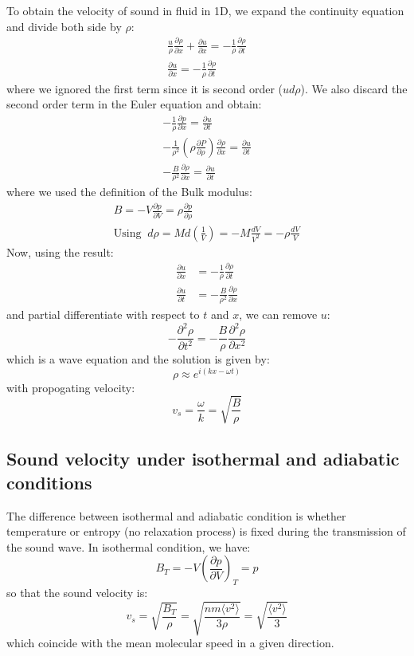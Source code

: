 \documentclass{article}
\newcommand{\pfrac}[2]{\frac{\partial #1}{\partial #2}}
\begin{document}
To obtain the velocity of sound in fluid in 1D, we expand the continuity equation and divide 
both side by $\rho$:
\begin{gather}
    \frac{u}{\rho} \pfrac{\rho}{x} + \pfrac{u}{x} = - \frac{1}{\rho} \pfrac{\rho}{t} \\ 
    \pfrac{u}{x} = - \frac{1}{\rho} \pfrac{\rho}{t}
\end{gather}
where we ignored the first term since it is second order ($u d\rho$). 
We also discard the second order term in the Euler equation and obtain:
\begin{gather}
    -\frac{1}{\rho} \frac{\partial p}{\partial x} = \frac{\partial u}{\partial t} \\
    - \frac{1}{\rho^2} \left( \rho \pfrac{P}{\rho} \right) \pfrac{\rho}{x} = \frac{\partial u}{\partial t} \\
    - \frac{B}{\rho^2} \pfrac{\rho}{x} = \frac{\partial u}{\partial t}
\end{gather}
where we used the definition of the Bulk modulus:
\begin{gather}
    B = -V \pfrac{p}{V} = \rho \pfrac{p}{\rho} \\
    \text{Using  } \ d\rho = M d\left( \frac{1}{V} \right) = - M \frac{dV}{V^2} = - \rho \frac{dV}{V}
\end{gather}
Now, using the result:
\begin{align}
    \pfrac{u}{x} &= - \frac{1}{\rho} \pfrac{\rho}{t} \\
    \frac{\partial u}{\partial t} &= - \frac{B}{\rho^2} \pfrac{\rho}{x}
\end{align}
and partial differentiate with respect to $t$ and $x$, we can remove $u$:
\begin{equation}
    - \frac{\partial^2 \rho}{\partial t^2} = - \frac{B}{\rho} \frac{\partial^2 \rho}{\partial x^2}
\end{equation}
which is a wave equation and the solution is given by:
\begin{equation}
    \rho \approx e^{i(kx-\omega t)}
\end{equation}
with propogating velocity:
\begin{equation}
    v_s = \frac{\omega}{k} = \sqrt{\frac{B}{\rho}}
\end{equation}

\subsection{Sound velocity under isothermal and adiabatic conditions}
The difference between isothermal and adiabatic condition is whether temperature
or entropy (no relaxation process) is fixed during the transmission of the 
sound wave. In isothermal condition, we have:
\begin{equation}
    B_T = -V \left( \pfrac{p}{V} \right)_T = p
\end{equation}
so that the sound velocity is:
\begin{equation}
    v_s = \sqrt{\frac{B_T}{\rho}} = \sqrt{\frac{nm\langle v^2\rangle}{3\rho}} = \sqrt{\frac{\langle v^2\rangle}{3}}
\end{equation}
which coincide with the mean molecular speed in a given direction.
\end{document}
